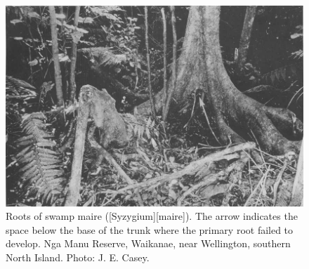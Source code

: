\begin{figure}[htb]
	\centering
	\begin{minipage}[t]{0.678\textwidth}
		\centering
		\includegraphics[width=\textwidth]{graphics/figure14swampmaire.jpg}
    	\caption[Roots of swamp maire]{Roots of swamp maire ([Syzygium][maire]).
    	The arrow indicates the space below the base of the trunk where the primary root failed to develop.
    	Nga Manu Reserve, Waikanae, near Wellington, southern North Island.
    	Photo:  J. E. Casey.}%
    	\label{fig:14swampmaire}
	\end{minipage}\hfill%
	\begin{minipage}[t]{0.302\textwidth}
    	\centering

\end{minipage}
\end{figure}
